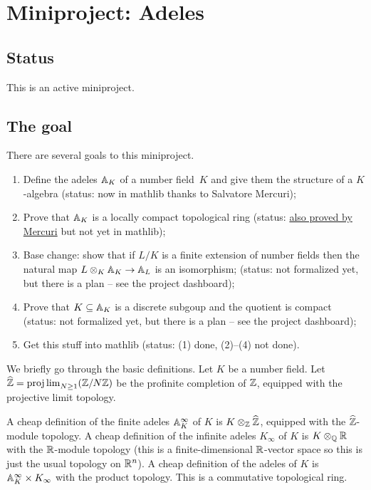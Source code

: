 \chapter{Miniproject: Adeles}\label{Adele_miniproject}

\section{Status}

This is an active miniproject.

\section{The goal}

There are several goals to this miniproject.

\begin{enumerate}
  \item Define the adeles $\mathbb{A}_K$ of a number field~$K$ and
    give them the structure of a $K$-algebra (status: now in mathlib thanks to
    Salvatore Mercuri);
  \item Prove that $\mathbb{A}_K$ is a locally compact topological ring (status:
      \href{https://github.com/smmercuri/adele-ring_locally-compact}{
      also proved by Mercuri} but not yet in mathlib);
  \item Base change: show that if $L/K$ is a finite extension of number fields then the
    natural map $L\otimes_K\mathbb{A}_K\to\mathbb{A}_L$ is an isomorphism; (status: not
    formalized yet, but there is a plan -- see the project dashboard);
  \item Prove that $K \subseteq \mathbb{A}_K$ is a discrete subgoup and the quotient
    is compact (status: not formalized yet, but there is a plan -- see the project
    dashboard);
  \item Get this stuff into mathlib (status: (1) done, (2)--(4) not done).
\end{enumerate}

We briefly go through the basic definitions. Let $K$ be a number field.
Let $\widehat{\mathbb{Z}}=\projlim_{N\geq1}(\mathbb{Z}/N\mathbb{Z})$ be the profinite completion of $\mathbb{Z}$,
equipped with the projective limit topology.

A cheap definition of the finite adeles $\mathbb{A}_K^\infty$ of $K$ is $K\otimes_{\mathbb{Z}}\widehat{\mathbb{Z}}$,
equipped with the $\widehat{\mathbb{Z}}$-module topology.
A cheap definition of the infinite adeles
$K_\infty$ of $K$ is $K\otimes_{\mathbb{Q}}\mathbb{R}$ with the $\mathbb{R}$-module topology (this is a
finite-dimensional $\mathbb{R}$-vector space so this is just the usual topology on $\mathbb{R}^n$).
A cheap definition of the adeles of $K$ is $\mathbb{A}_K^\infty\times K_\infty$ with
the product topology. This is a commutative topological ring.

